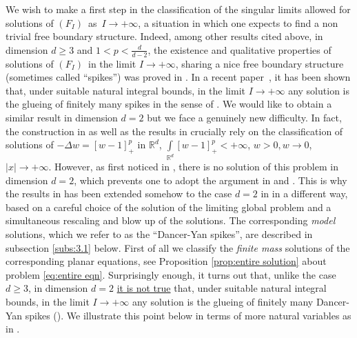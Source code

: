 \documentclass[10pt]{amsart}
\newcommand{\R}{\mathbb{R}}
\def\R{\mathbb{R}}
\renewcommand{\to}{\rightarrow}
\newcommand{\ii}{\infty}
\newcommand{\fbi}{{$(F_{I})$}}
\begin{document}
\medskip

We wish to make a first step in the classification of the singular limits allowed for solutions of \fbi\, as~$I\to +\ii$, a situation in which one expects to find
a non trivial free boundary structure. Indeed, among other results cited above, in dimension $d\geq 3$ and $1<p<\frac{d}{d-2}$,
the existence and qualitative properties of solutions of \fbi\, in the limit $I\to +\ii$, sharing a nice free boundary structure (sometimes called ``spikes'') was proved in \cite{FW,W}.
In a recent paper~\cite{BJW}, it has been shown that, under suitable natural integral bounds, in the limit $I\to +\ii$ any solution is the glueing of finitely many
spikes in the sense of \cite{FW,W}. We would like to obtain a similar result in dimension $d=2$ but we face a genuinely new difficulty. In fact, the construction
in \cite{FW,W} as well as the results in \cite{BJW} crucially rely on the classification of solutions of
$-\Delta w=[w-1]_+^p \mbox{ in } \R^d$, $\int\limits_{\R^d}[w-1]_+^p<+\ii$, $w>0, w\to 0$, $|x|\to +\ii$. However, as first noticed in \cite{DY},
there is no solution of this problem in dimension $d=2$, which prevents one to adopt the argument in \cite{FW} and \cite{W}.
This is why the results in \cite{FW} has been extended somehow to the case $d=2$ in \cite{DY} in a different way,
based on a careful choice of the solution of the limiting global problem and a simultaneous rescaling and blow up of the solutions.
 The corresponding \emph{model} solutions, which we refer to as the ``Dancer-Yan spikes'', are described in subsection \ref{subs:3.1} below.
First of all we classify the \emph{finite mass} solutions of the corresponding planar equations,
see Proposition \ref{prop:entire solution} about problem \eqref{eq:entire eqn}. Surprisingly enough,
it turns out that, unlike the case $d\geq 3$, in dimension $d=2$ \underline{it is not true} that, under suitable natural integral bounds,
in the limit $I\to +\ii$ any solution is the glueing of finitely many Dancer-Yan spikes (\cite{DY}). We illustrate this point below in terms of
more natural variables as in \cite{BJW}.

\medskip
\end{document}
